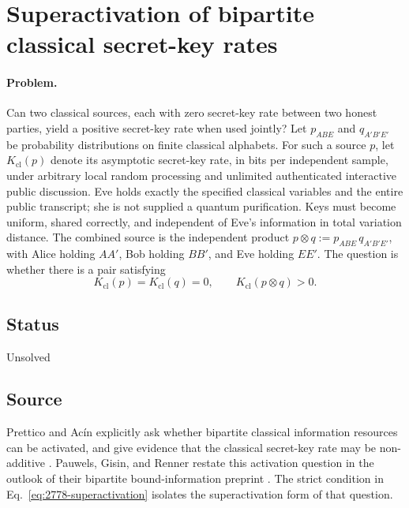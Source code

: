 \section{Superactivation of bipartite classical secret-key rates}
\label{sec:op_2778126c209a3d49}

\paragraph{Problem.}
Can two classical sources, each with zero secret-key rate between two
honest parties, yield a positive secret-key rate when used jointly?  Let
$p_{ABE}$ and $q_{A'B'E'}$ be probability distributions on finite classical
alphabets.  For such a source $p$, let $K_{\mathrm{cl}}(p)$ denote its
asymptotic secret-key rate, in bits per independent sample, under arbitrary
local random processing and unlimited authenticated interactive public
discussion.  Eve holds exactly the specified classical variables and the entire
public transcript; she is not supplied a quantum purification.  Keys must
become uniform, shared correctly, and independent of Eve's information in
total variation distance.  The combined source is the independent product
$p\otimes q:=p_{ABE}\,q_{A'B'E'}$, with Alice holding $AA'$, Bob holding
$BB'$, and Eve holding $EE'$.  The question is whether there is a pair
satisfying
\begin{equation}
  K_{\mathrm{cl}}(p)=K_{\mathrm{cl}}(q)=0,
  \qquad
  K_{\mathrm{cl}}(p\otimes q)>0.
  \label{eq:2778-superactivation}
\end{equation}

\subsection*{Status}

Unsolved

\subsection*{Source}

Prettico and Ac\'in explicitly ask whether bipartite classical information
resources can be activated, and give evidence that the classical secret-key
rate may be non-additive .  Pauwels, Gisin, and
Renner restate this activation question in the outlook of their bipartite
bound-information preprint .  The strict
condition in Eq.~\eqref{eq:2778-superactivation} isolates the superactivation
form of that question.

